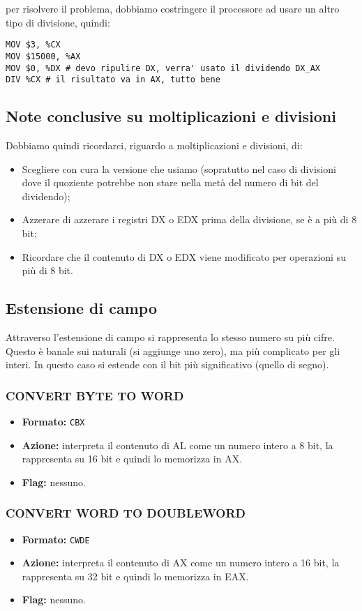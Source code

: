 \documentclass[a4paper,11pt]{article}
\begin{document}
per risolvere il problema, dobbiamo costringere il processore ad usare un altro tipo di divisione, quindi:
\begin{lstlisting}[language=assembler,style=codestyle]	
MOV $3, %CX
MOV $15000, %AX
MOV $0, %DX	# devo ripulire DX, verra' usato il dividendo DX_AX 
DIV %CX	# il risultato va in AX, tutto bene 
\end{lstlisting}

\subsection{Note conclusive su moltiplicazioni e divisioni}
Dobbiamo quindi ricordarci, riguardo a moltiplicazioni e divisioni, di:
\begin{itemize}
	\item Scegliere con cura la versione che usiamo (sopratutto nel caso di divisioni dove il quoziente potrebbe non stare nella metà del numero di bit del dividendo);
	\item Azzerare di azzerare i registri DX o EDX prima della divisione, se è a più di 8 bit;
	\item Ricordare che il contenuto di DX o EDX viene modificato per operazioni su più di 8 bit.
\end{itemize}

\subsection{Estensione di campo}
Attraverso l'estensione di campo si rappresenta lo stesso numero su più cifre.
Questo è banale sui naturali (si aggiunge uno zero), ma più complicato per gli interi.
In questo caso si estende con il bit più significativo (quello di segno).

\subsubsection{CONVERT BYTE TO WORD}
\begin{itemize}
	\item \textbf{Formato:} \lstinline|CBX|
	\item \textbf{Azione:} interpreta il contenuto di AL come un numero intero a 8 bit, la rappresenta su 16 bit e quindi lo memorizza in AX.
	\item \textbf{Flag:} nessuno.
\end{itemize}

\subsubsection{CONVERT WORD TO DOUBLEWORD}
\begin{itemize}
	\item \textbf{Formato:} \lstinline|CWDE|
	\item \textbf{Azione:} interpreta il contenuto di AX come un numero intero a 16 bit, la rappresenta su 32 bit e quindi lo memorizza in EAX.
	\item \textbf{Flag:} nessuno.
\end{itemize}
\end{document}

